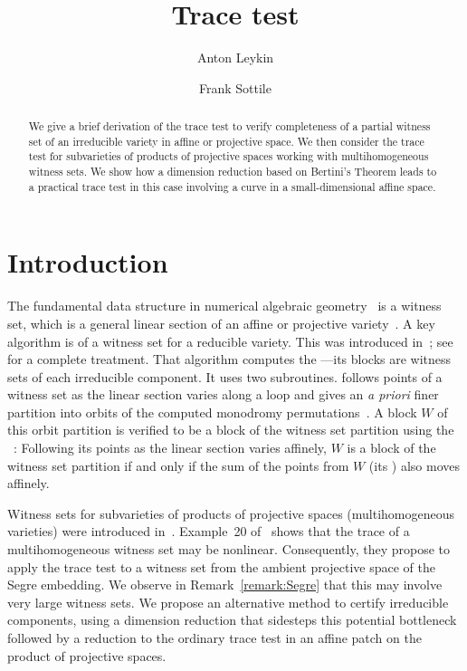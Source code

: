 \documentclass[12pt]{amsart}
\title{Trace test}
\author[A.~Leykin]{Anton Leykin}
\author[F.~Sottile]{Frank Sottile}
\theoremstyle{definition}
\begin{document}
\begin{abstract}
We give a brief derivation of the trace test to verify completeness of a partial witness set of an irreducible variety in affine or
projective space.
We then consider the trace test for subvarieties of products of projective spaces
working with multihomogeneous witness sets.
We show how a dimension reduction based on Bertini's Theorem
leads to a practical trace test in this case involving a curve in a small-dimensional affine space.
\end{abstract}
\maketitle

\section*{Introduction}
The fundamental data structure in numerical algebraic geometry~\cite{SW05} is a witness set, which is a
general linear section of an affine or projective variety~\cite{SV}.
A key algorithm is {{{}}} of a witness set for a reducible
variety.
This was introduced in~\cite{SVW_decomposition}; see~\cite[Ch.~15]{SW05} for a complete treatment.
That algorithm computes the {{{}}}---its blocks are witness sets
of each irreducible component.
It uses two subroutines.
{{{}}} follows points of a witness set as the linear section varies along a
loop and gives an {\it a priori} finer partition into orbits of the computed monodromy
permutations~\cite{SVW_monodromy}.
A block $W$ of this orbit partition is verified to be a block of the witness set partition
using the {{{}}}~\cite{SVW_trace}:
Following its points as the linear section varies affinely,
$W$ is a block of the witness set partition if and only if the sum of the
points from $W$ (its {{{}}}) also moves affinely.

Witness sets for subvarieties of products of projective spaces (multihomogeneous varieties) were introduced
in~\cite{HR15}.
Example~20 of~\cite{HR15} shows that the trace of a multihomogeneous witness set may be nonlinear.
Consequently, they propose to apply the trace test to a witness set from the ambient projective space of the Segre
embedding.
We observe in Remark~\ref{remark:Segre} that this may involve very large witness sets.
We propose an alternative method to certify irreducible components, using a dimension reduction that
sidesteps this potential bottleneck followed by a reduction to the ordinary trace test in an affine patch
on the product of projective spaces.
\end{document}
